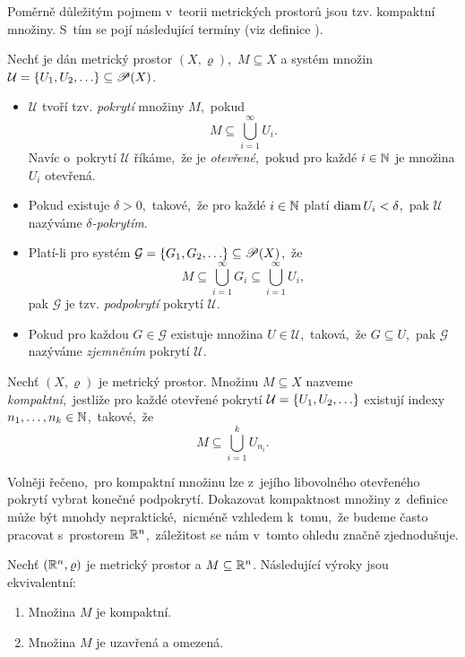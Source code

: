 Poměrně důležitým pojmem v~teorii metrických prostorů jsou tzv. kompaktní množiny. S~tím se pojí následující termíny (viz definice ).
\begin{definition}\label{def:delta-pokryti-zjemneni}
    Nechť je dán metrický prostor $(X,\varrho)$,~$M\subseteq X$ a systém množin $\mathcal{U}=\left\{U_1,U_2,\ldots\right\}\subseteq\mathscr{P}(X)$.
    \begin{itemize}
        \item $\mathcal{U}$ tvoří tzv. \emph{pokrytí} množiny $M$,~pokud
        \[M\subseteq\bigcup_{i=1}^\infty U_i.\]
        Navíc o~pokrytí $\mathcal{U}$ říkáme,~že je \emph{otevřené},~pokud pro každé $i\in\mathbb{N}$ je množina $U_i$ otevřená.
        \item Pokud existuje $\delta>0$,~takové,~že pro každé $i\in\mathbb{N}$ platí $\operatorname{diam}{U_i}<\delta$,~pak $\mathcal{U}$ nazýváme \emph{$\delta$-pokrytím}.
        \item Platí-li pro systém $\mathcal{G}=\left\{G_1,G_2,\ldots\right\}\subseteq\mathscr{P}(X)$,~že
        \[M\subseteq\bigcup_{i=1}^\infty G_i\subseteq\bigcup_{i=1}^\infty U_i,\]
        pak $\mathcal{G}$ je tzv. \emph{podpokrytí} pokrytí $\mathcal{U}$.
        \item Pokud pro každou $G\in\mathcal{G}$ existuje množina $U\in\mathcal{U}$,~taková,~že $G\subseteq U$,~pak $\mathcal{G}$ nazýváme \emph{zjemněním} pokrytí $\mathcal{U}$. 
    \end{itemize}
\end{definition}
\begin{definition}\label{def:kompaktni-mnozina}
    Nechť $(X,\varrho)$ je metrický prostor. Množinu $M\subseteq X$ nazveme \emph{kompaktní},~jestliže pro každé otevřené pokrytí $\mathcal{U}=\left\{U_1,U_2,\ldots\right\}$ existují indexy $n_1,\ldots,n_k\in\mathbb{N}$,~takové,~že
    \[M\subseteq\bigcup_{i=1}^k U_{n_i}.\]
\end{definition}
Volněji řečeno,~pro kompaktní množinu lze z~jejího libovolného otevřeného pokrytí vybrat konečné podpokrytí. Dokazovat kompaktnost množiny z~definice může být mnohdy nepraktické,~nicméně vzhledem k~tomu,~že budeme často pracovat s~prostorem $\mathbb{R}^n$,~záležitost se nám v~tomto ohledu značně zjednodušuje.
\begin{theorem}\label{thm:heine-borel}
    Nechť $(\mathbb{R}^n,\varrho)$ je metrický prostor a $M\subseteq\mathbb{R}^n$. Následující výroky jsou ekvivalentní:
    \begin{enumerate}[label=(\roman*)]
        \item Množina $M$ je kompaktní.
        \item Množina $M$ je uzavřená a omezená.
    \end{enumerate}
\end{theorem}
